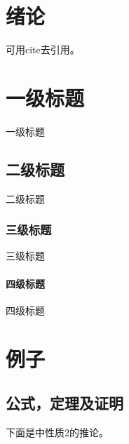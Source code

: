 \documentclass[openany,oneside]{book}
\theoremstyle{cthmstyle}
\theoremstyle{definition}
\theoremstyle{remark}
\begin{document}
\frontmatter
\sloppy %




\tableofcontents
{\xiaosi}
\clearpage{\pagestyle{empty}\cleardoublepage}

\mainmatter
{}                        %

\chapter{绪论}

可用cite去引用。\cite{dean2008mapreduce, marxapplication}

\lipsum



\chapter{一级标题}

一级标题

\section{二级标题}

{\hei 二级标题}

\subsection{三级标题}

三级标题

\subsubsection{四级标题}

四级标题

\chapter{例子}

\section{公式，定理及证明}

下面是\cite{bzj2006constcurative}中性质2的推论。
\end{document}
